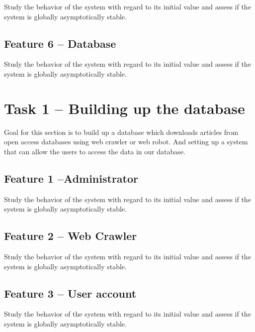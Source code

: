 \documentclass[a4paper]{article} %
\begin{document}
Study the behavior of the system with regard to its initial value and assess if the system is globally asymptotically stable.

\subsection*{Feature 6 -- Database}
\label{task1:feature6}

Study the behavior of the system with regard to its initial value and assess if the system is globally asymptotically stable.



\section*{Task 1 -- Building up the database}
\label{task1}

Goal for this section is to build up a database which downloads articles from open access databases using web crawler or web robot. And setting up a system that can allow the users to access the data in our database.

\subsection*{Feature 1 --Administrator}
\label{task1:feature1}

Study the behavior of the system with regard to its initial value and assess if the system is globally asymptotically stable.

\subsection*{Feature 2 -- Web Crawler}
\label{task1:feature2}

Study the behavior of the system with regard to its initial value and assess if the system is globally asymptotically stable.

\subsection*{Feature 3 -- User account}
\label{task1:feature3}

Study the behavior of the system with regard to its initial value and assess if the system is globally asymptotically stable.
\end{document}
